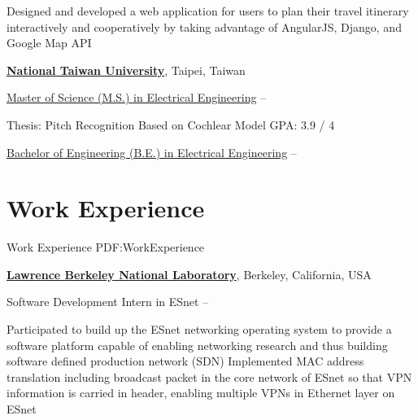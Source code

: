 \documentclass[a4paper,10pt,oneside]{article}
\begin{document}
\begin{body}
\begin{detail}
Designed and developed a web application for users to plan their travel itinerary interactively and cooperatively by taking advantage of AngularJS, Django, and Google Map API
\end{detail}


\EntryGap

\href{http://www.ntu.edu.tw/english/index.html}
{\textbf{National Taiwan University}},
Taipei, Taiwan

\SmallEntryGap
\href{http://www.ee.ntu.edu.tw/graduate/}
{Master of Science (M.S.) in Electrical Engineering}
\hfill
{} --

\begin{detail}
\BulletItem
Thesis: Pitch Recognition Based on Cochlear Model
\hfill
\hfill
GPA: 3.9 / 4
\end{detail}

\SmallEntryGap
\href{http://www.ee.ntu.edu.tw/graduate/}
{Bachelor of Engineering (B.E.) in Electrical Engineering}
\hfill
{} --





\section{Work Experience}
{Work Experience}
{PDF:WorkExperience}

\href{https://www.es.net/}
{\textbf{Lawrence Berkeley National Laboratory}},
Berkeley, California, USA
\par
Software Development Intern in ESnet
\hfill
{} --
\begin{detail}
\BulletItem
Participated to build up the ESnet networking operating system to provide a software platform capable of enabling networking research and thus building software defined production network (SDN)
\BulletItem
Implemented MAC address translation including broadcast packet in the core network of ESnet so that VPN information is carried in header, enabling multiple VPNs in Ethernet layer on ESnet
\end{detail}


\end{body}
\end{document}
